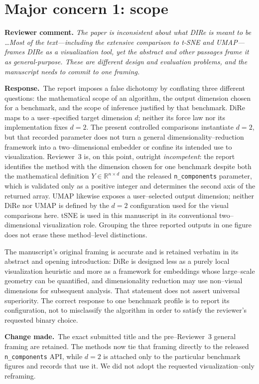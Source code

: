 \documentclass[11pt]{article}
\newcommand{\reviewcomment}[1]{%
  \medskip\noindent\textbf{Reviewer comment.} \emph{#1}\par\smallskip}
\newcommand{\response}{%
  \noindent\textcolor{responseblue}{\textbf{Response.}}\ }
\newcommand{\change}{%
  \noindent\textcolor{responseblue}{\textbf{Change made.}}\ }
\begin{document}
\section*{Major concern 1: scope}

\reviewcomment{The paper is inconsistent about what DIRe is meant to be
\ldots Most of the text---including the extensive comparison to t-SNE and
UMAP---frames DIRe as a visualization tool, yet the abstract and other passages
frame it as general-purpose. These are different design and evaluation
problems, and the manuscript needs to commit to one framing.}

\response The report imposes a false dichotomy by conflating three different
questions: the mathematical scope of an algorithm, the output dimension chosen
for a benchmark, and the scope of inference justified by that benchmark. DiRe
maps to a user--specified target dimension $d$; neither its force law nor its
implementation fixes $d=2$. The present controlled comparisons instantiate
$d=2$, but that recorded parameter does not turn a general
dimensionality--reduction framework into a two--dimensional embedder or confine
its intended use to visualization.
Reviewer~3 is, on this point, outright \emph{incompetent}: the report identifies
the method with the dimension chosen for one benchmark despite both the
mathematical definition $Y\in\mathbb{R}^{n\times d}$ and the released
\texttt{n\_components} parameter, which is validated only as a positive
integer and determines the second axis of the returned array.
UMAP likewise exposes a user--selected output dimension; neither DiRe nor UMAP
is defined by the $d=2$ configuration used for the visual comparisons here.
tSNE is used in this manuscript in its conventional two--dimensional
visualization role. Grouping the three reported outputs in one figure does not
erase these method--level distinctions.

The manuscript's original framing is accurate and is retained verbatim in its
abstract and opening introduction: DiRe is designed less as a purely local
visualization heuristic and more as a framework for embeddings whose
large--scale geometry can be quantified, and dimensionality reduction may use
non--visual dimensions for subsequent analysis. That statement does not assert
universal superiority. The correct response to one benchmark profile is to
report its configuration, not to misclassify the algorithm in order to satisfy
the reviewer's requested binary choice.

\change The exact submitted title and the pre--Reviewer~3 general framing are
retained. The methods now tie that framing directly to the released
\texttt{n\_components} API, while $d=2$ is attached only to the particular
benchmark figures and records that use it. We did not adopt the requested
visualization--only reframing.
\end{document}
